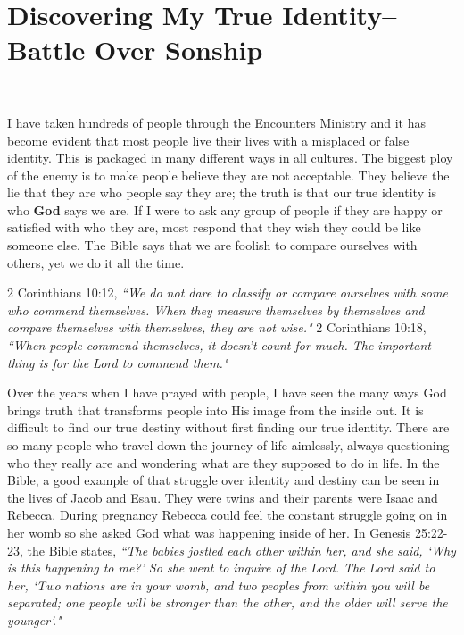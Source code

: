 \documentclass[oneside,12pt]{book}
\begin{document}
\chapter{Discovering My True Identity--Battle Over Sonship}
\

I have taken hundreds of people through the Encounters Ministry and it has become evident that most people live their lives with a misplaced or false identity. This is packaged in many different ways in all cultures. The biggest ploy of the enemy is to make people believe they are not acceptable. They believe the lie that they are who people say they are; the truth is that our true identity is who \textbf{God} says we are. If I were to ask any group of people if they are happy or satisfied with who they are, most respond that they wish they could be like someone else. The Bible says that we are foolish to compare ourselves with others, yet we do it all the time.

2 Corinthians 10:12, \textit{``We do not dare to classify or compare ourselves with some who commend themselves. When they measure themselves by themselves and compare themselves with themselves, they are not wise."}
2 Corinthians 10:18, \textit{``When people commend themselves, it doesn't count for much. The important thing is for the Lord to commend them."}

Over the years when I have prayed with people, I have seen the many ways God brings truth that transforms people into His image from the inside out. It is difficult to find our true destiny without first finding our true identity. There are so many people who travel down the journey of life aimlessly, always questioning who they really are and wondering what are they supposed to do in life. In the Bible, a good example of that struggle over identity and destiny can be seen in the lives of Jacob and Esau. They were twins and their parents were Isaac and Rebecca. During pregnancy Rebecca could feel the constant struggle going on in her womb so she asked God what was happening inside of her. In Genesis 25:22-23, the Bible states, \textit{``The babies jostled each other within her, and she said, `Why is this happening to me?' So she went to inquire of the Lord. The Lord said to her, `Two nations are in your womb, and two peoples from within you will be separated; one people will be stronger than the other, and the older will serve the younger'."}
\end{document}
